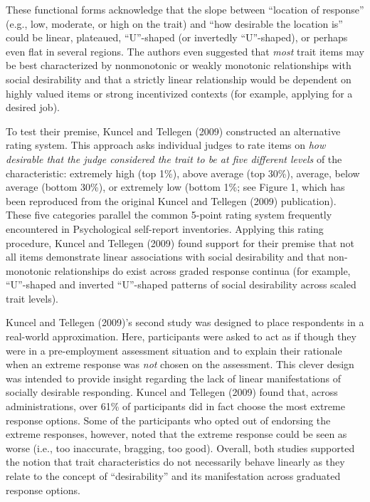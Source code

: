 \documentclass[
  english,
  ,jou]{apa6}
\begin{document}
These functional forms acknowledge that the slope between ``location of response'' (e.g., low, moderate, or high on the trait) and ``how desirable the location is'' could be linear, plateaued, ``U''-shaped (or invertedly ``U''-shaped), or perhaps even flat in several regions. The authors even suggested that \emph{most} trait items may be best characterized by nonmonotonic or weakly monotonic relationships with social desirability and that a strictly linear relationship would be dependent on highly valued items or strong incentivized contexts (for example, applying for a desired job).

To test their premise, Kuncel and Tellegen (2009) constructed an alternative rating system. This approach asks individual judges to rate items on \emph{how desirable that the judge considered the trait to be at five different levels} of the characteristic: extremely high (top 1\%), above average (top 30\%), average, below average (bottom 30\%), or extremely low (bottom 1\%; see Figure 1, which has been reproduced from the original Kuncel and Tellegen (2009) publication). These five categories parallel the common 5-point rating system frequently encountered in Psychological self-report inventories. Applying this rating procedure, Kuncel and Tellegen (2009) found support for their premise that not all items demonstrate linear associations with social desirability and that non-monotonic relationships do exist across graded response continua (for example, ``U''-shaped and inverted ``U''-shaped patterns of social desirability across scaled trait levels).

Kuncel and Tellegen (2009)'s second study was designed to place respondents in a real-world approximation. Here, participants were asked to act as if though they were in a pre-employment assessment situation and to explain their rationale when an extreme response was \emph{not} chosen on the assessment. This clever design was intended to provide insight regarding the lack of linear manifestations of socially desirable responding. Kuncel and Tellegen (2009) found that, across administrations, over 61\% of participants did in fact choose the most extreme response options. Some of the participants who opted out of endorsing the extreme responses, however, noted that the extreme response could be seen as worse (i.e., too inaccurate, bragging, too good). Overall, both studies supported the notion that trait characteristics do not necessarily behave linearly as they relate to the concept of ``desirability'' and its manifestation across graduated response options.
\end{document}
